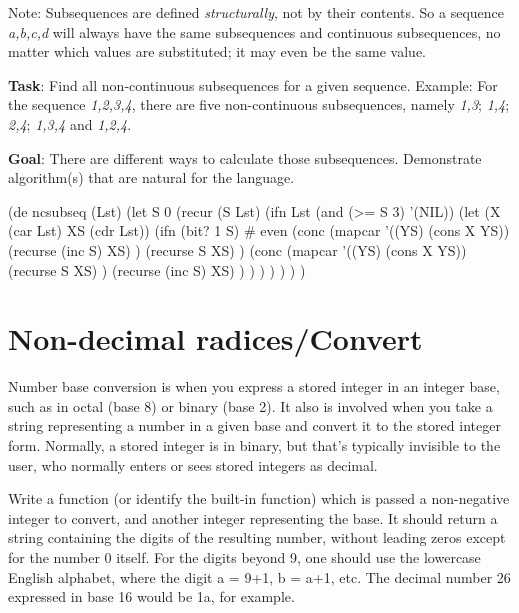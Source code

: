 Note: Subsequences are defined \emph{structurally}, not by their
contents. So a sequence \emph{a,b,c,d} will always have the same
subsequences and continuous subsequences, no matter which values are
substituted; it may even be the same value.

\textbf{Task}: Find all non-continuous subsequences for a given
sequence. Example: For the sequence \emph{1,2,3,4}, there are five
non-continuous subsequences, namely \emph{1,3}; \emph{1,4}; \emph{2,4};
\emph{1,3,4} and \emph{1,2,4}.

\textbf{Goal}: There are different ways to calculate those subsequences.
Demonstrate algorithm(s) that are natural for the language.


\begin{wideverbatim}

(de ncsubseq (Lst)
   (let S 0
      (recur (S Lst)
         (ifn Lst
            (and (>= S 3) '(NIL))
            (let (X (car Lst)  XS (cdr Lst))
               (ifn (bit? 1 S)  # even
                  (conc
                     (mapcar '((YS) (cons X YS))
                        (recurse (inc S) XS) )
                     (recurse S XS) )
                  (conc
                     (mapcar '((YS) (cons X YS))
                        (recurse S XS) )
                     (recurse (inc S) XS) ) ) ) ) ) ) )

\end{wideverbatim}

\pagebreak{}
\section*{Non-decimal radices/Convert}

Number base conversion is when you express a stored integer in an
integer base, such as in octal (base 8) or binary (base 2). It also is
involved when you take a string representing a number in a given base
and convert it to the stored integer form. Normally, a stored integer is
in binary, but that's typically invisible to the user, who normally
enters or sees stored integers as decimal.

Write a function (or identify the built-in function) which is passed a
non-negative integer to convert, and another integer representing the
base. It should return a string containing the digits of the resulting
number, without leading zeros except for the number 0 itself. For the
digits beyond 9, one should use the lowercase English alphabet, where
the digit a = 9+1, b = a+1, etc. The decimal number 26 expressed in base
16 would be 1a, for example.

